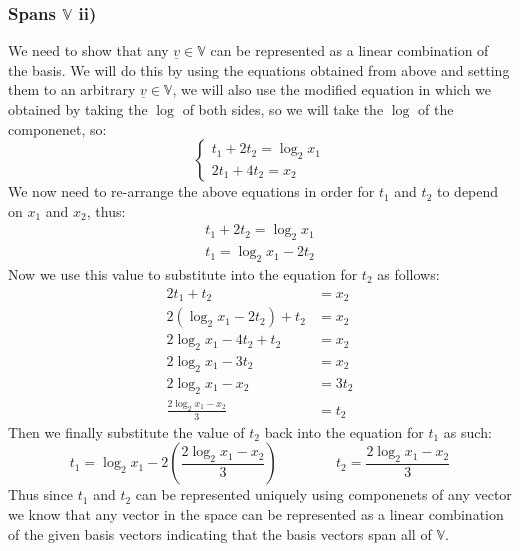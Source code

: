 \documentclass{article}
\begin{document}
\subsubsection*{Spans $\mathbb{V}$ ii)}
We need to show that any $\underline{v}\in\mathbb{V}$ can be represented as a linear combination of the basis. We will do this by using the equations obtained from above and setting them to an arbitrary $\underline{v}\in\mathbb{V}$, we will also use the modified equation in which we obtained by taking the $\log$ of both sides, so we will take the $\log$ of the componenet, so: $$\begin{cases}
t_{1}+2t_{2}=\log_{2}{x_{1}}\\
2t_{1}+4t_{2}=x_{2}
\end{cases}$$
We now need to re-arrange the above equations in order for $t_{1}$ and $t_{2}$ to depend on $x_{1}$ and $x_{2}$, thus:$$\begin{aligned}
    t_{1}+2t_{2}=\log_{2}x_{1}\\
    t_{1}=\log_{2}x_{1}-2t_{2}
\end{aligned}$$
Now we use this value to substitute into the equation for $t_{2}$ as follows: $$\begin{aligned}
    2t_{1}+t_{2}&=x_{2}\\
    2(\log_{2}x_{1}-2t_{2})+t_{2}&=x_{2}\\
    2\log_{2}x_{1}-4t_{2}+t_{2}&=x_{2}\\
    2\log_{2}x_{1}-3t_{2}&=x_{2}\\
    2\log_{2}x_{1}-x_{2}&=3t_{2}\\
    \frac{2\log_{2}x_{1}-x_{2}}{3}&=t_{2}
\end{aligned}$$
Then we finally substitute the value of $t_{2}$ back into the equation for $t_{1}$ as such: $$t_{1}=\log_{2}x_{1}-2(\frac{2\log_{2}x_{1}-x_{2}}{3})\;\;\;\;\;\;\;\;\;\;\;\;\;\;\;t_{2}=\frac{2\log_{2}x_{1}-x_{2}}{3}$$
Thus since $t_{1}$ and $t_{2}$ can be represented uniquely using componenets of any vector we know that any vector in the space can be represented as a linear combination of the given basis vectors indicating that the basis vectors span all of $\mathbb{V}$. 
\end{document}
